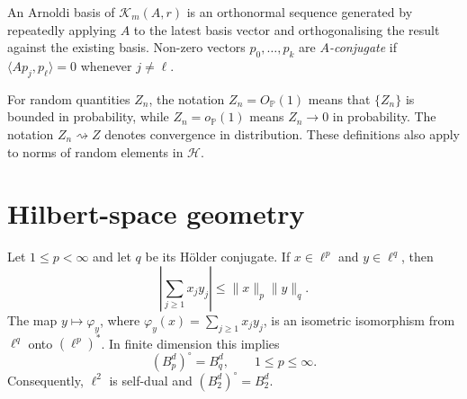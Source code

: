 \begin{definition}
An Arnoldi basis of $\mathcal K_m(A,r)$ is an orthonormal sequence generated
by repeatedly applying $A$ to the latest basis vector and orthogonalising the
result against the existing basis.  Non-zero vectors $p_0,\ldots,p_k$ are
\emph{$A$-conjugate} if $\langle Ap_j,p_\ell\rangle=0$ whenever
$j\neq\ell$.
\end{definition}

\begin{definition}
For random quantities $Z_n$, the notation $Z_n=O_{\mathbb P}(1)$ means that
$\{Z_n\}$ is bounded in probability, while $Z_n=o_{\mathbb P}(1)$ means
$Z_n\to0$ in probability.  The notation $Z_n\rightsquigarrow Z$ denotes
convergence in distribution.  These definitions also apply to norms of
random elements in $\mathcal H$.
\end{definition}

\section{Hilbert-space geometry}
\label{sec:app-hilbert-proofs}

\begin{theorem}
\label{thm:app-lp-duality}
Let $1\leq p<\infty$ and let $q$ be its H\"older conjugate.  If
$x\in\ell^p$ and $y\in\ell^q$, then
\begin{equation}
    \left|\sum_{j\geq1}x_jy_j\right|
    \leq \|x\|_p\|y\|_q.
    \label{eq:app-holder-sequence}
\end{equation}
The map $y\mapsto\varphi_y$, where
$\varphi_y(x)=\sum_{j\geq1}x_jy_j$, is an isometric isomorphism from
$\ell^q$ onto $(\ell^p)^*$.  In finite dimension this implies
\[
    (B_p^d)^\circ=B_q^d,
    \qquad 1\leq p\leq\infty.
\]
Consequently, $\ell^2$ is self-dual and $(B_2^d)^\circ=B_2^d$.
\end{theorem}

